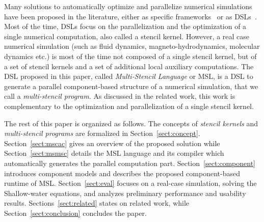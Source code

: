 Many solutions to automatically optimize and parallelize numerical simulations have been proposed in the literature, either as specific frameworks~\cite{CPE:CPE3494,Trilinos-Overview,petsc-efficient} or as DSLs~\cite{spaaTangCKLL11,citeulike12258902,Giles2011,DeVito2011LDS, Ragan-Kelley:2013:HLC:2491956.2462176}. Most of the time, DSLs focus on the parallelization and the optimization of a single numerical computation, also called a stencil kernel.
However, a real case numerical simulation (such as fluid dynamics, magneto-hydrodynamics, molecular dynamics etc.) is most of the time not composed of a single stencil kernel, but of a set of stencil kernels and a set of additional local auxiliary computations. The DSL proposed in this paper, called \emph{Multi-Stencil Language} or MSL, is a DSL to generate a parallel component-based structure of a numerical simulation, that we call a \emph{multi-stencil program}. As discussed in the related work, this work is complementary to the optimization and parallelization of a single stencil kernel.

The rest of this paper is organized as follows. The concepts of \emph{stencil kernels} and \emph{multi-stencil programs} are formalized in Section~\ref{sect:concept}. Section~\ref{sect:mscac} gives an overview of the proposed solution while Section~\ref{sect:msmsc} details the MSL language and its compiler which automatically generates the parallel computation part. Section~\ref{sect:component} introduces component models and describes the proposed component-based runtime of MSL.
Section~\ref{sect:eval} focuses on a real-case simulation, solving the Shallow-water equations, and analyzes preliminary performance and usability results. Sections~\ref{sect:related} states on related work, while Section~\ref{sect:conclusion} concludes the paper.
